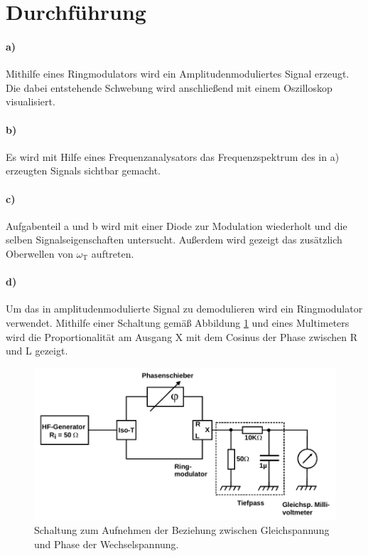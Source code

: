 \section{Durchführung}

\paragraph{a)}
\label{par:a}
Mithilfe eines Ringmodulators wird ein Amplitudenmoduliertes Signal erzeugt. Die dabei entstehende Schwebung wird anschließend mit einem
Oszilloskop visualisiert.

\paragraph{b)}
\label{par:b}
Es wird mit Hilfe eines Frequenzanalysators das Frequenzspektrum des in a) erzeugten Signals sichtbar gemacht.

\paragraph{c)}
\label{par:c}
Aufgabenteil a und b wird mit einer Diode zur Modulation wiederholt und die selben Signalseigenschaften untersucht.
Außerdem wird gezeigt das zusätzlich Oberwellen von $\omega_\text{T}$ auftreten.

\paragraph{d)}
\label{par:d}
Um das in amplitudenmodulierte Signal zu demodulieren wird ein Ringmodulator verwendet.
Mithilfe einer Schaltung gemäß Abbildung \ref{Abb14} und eines Multimeters wird die Proportionalität am Ausgang X mit dem Cosinus der Phase zwischen R und L gezeigt.

\begin{figure}
	\centering
	\includegraphics[width=\textwidth]{img/Abb14.pdf}
	\caption{Schaltung zum Aufnehmen der Beziehung zwischen Gleichspannung und Phase der Wechselspannung. \cite{FP}}
	\label{Abb14}
\end{figure}

